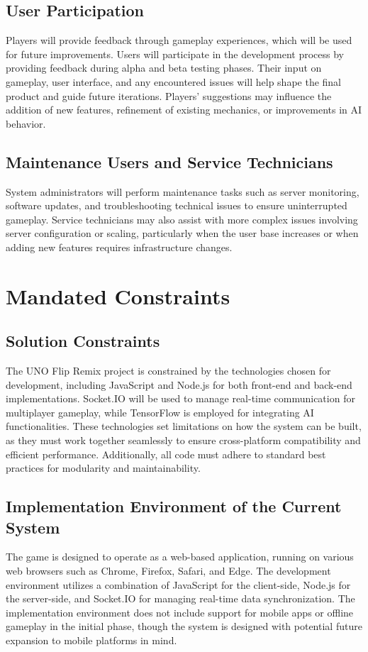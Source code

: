 \documentclass{article}
\begin{document}
\subsection{User Participation}
Players will provide feedback through gameplay experiences, which will be used for future improvements. Users will participate in the development process by providing feedback during alpha and beta testing phases. Their input on gameplay, user interface, and any encountered issues will help shape the final product and guide future iterations. Players’ suggestions may influence the addition of new features, refinement of existing mechanics, or improvements in AI behavior.

\subsection{Maintenance Users and Service Technicians}
System administrators will perform maintenance tasks such as server monitoring, software updates, and troubleshooting technical issues to ensure uninterrupted gameplay. Service technicians may also assist with more complex issues involving server configuration or scaling, particularly when the user base increases or when adding new features requires infrastructure changes.

\section{Mandated Constraints}

\subsection{Solution Constraints}
The UNO Flip Remix project is constrained by the technologies chosen for development, including JavaScript and Node.js for both front-end and back-end implementations. Socket.IO will be used to manage real-time communication for multiplayer gameplay, while TensorFlow is employed for integrating AI functionalities. These technologies set limitations on how the system can be built, as they must work together seamlessly to ensure cross-platform compatibility and efficient performance. Additionally, all code must adhere to standard best practices for modularity and maintainability.

\subsection{Implementation Environment of the Current System}
The game is designed to operate as a web-based application, running on various web browsers such as Chrome, Firefox, Safari, and Edge. The development environment utilizes a combination of JavaScript for the client-side, Node.js for the server-side, and Socket.IO for managing real-time data synchronization. The implementation environment does not include support for mobile apps or offline gameplay in the initial phase, though the system is designed with potential future expansion to mobile platforms in mind.
\end{document}
